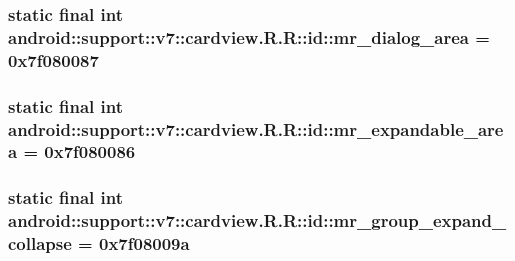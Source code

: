 \hypertarget{classandroid_1_1support_1_1v7_1_1cardview_1_1_r_1_1id_9159be352775d62066d2ccefa34fac52}{
\subsubsection[{mr\_\-dialog\_\-area}]{\setlength{\rightskip}{0pt plus 5cm}static final int android::support::v7::cardview.R.R::id::mr\_\-dialog\_\-area = 0x7f080087}}
\label{classandroid_1_1support_1_1v7_1_1cardview_1_1_r_1_1id_9159be352775d62066d2ccefa34fac52}


\hypertarget{classandroid_1_1support_1_1v7_1_1cardview_1_1_r_1_1id_7bd25898c55133671c4056108f175717}{
\subsubsection[{mr\_\-expandable\_\-area}]{\setlength{\rightskip}{0pt plus 5cm}static final int android::support::v7::cardview.R.R::id::mr\_\-expandable\_\-area = 0x7f080086}}
\label{classandroid_1_1support_1_1v7_1_1cardview_1_1_r_1_1id_7bd25898c55133671c4056108f175717}


\hypertarget{classandroid_1_1support_1_1v7_1_1cardview_1_1_r_1_1id_910cef2c5d77e9005ea0c4ae3f66070a}{
\subsubsection[{mr\_\-group\_\-expand\_\-collapse}]{\setlength{\rightskip}{0pt plus 5cm}static final int android::support::v7::cardview.R.R::id::mr\_\-group\_\-expand\_\-collapse = 0x7f08009a}}
\label{classandroid_1_1support_1_1v7_1_1cardview_1_1_r_1_1id_910cef2c5d77e9005ea0c4ae3f66070a}


